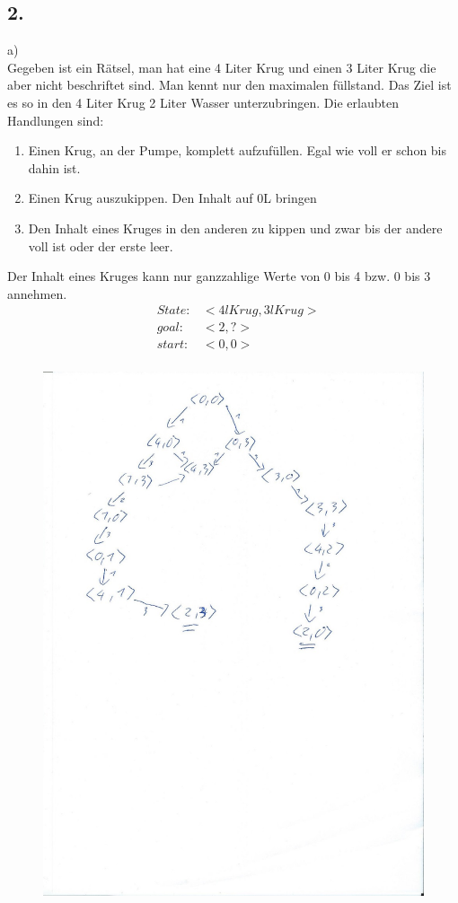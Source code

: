 \documentclass[12pt, paper=a4]{article}
\begin{document}
\subsection*{2.}
a)\\
Gegeben ist ein Rätsel, man hat eine 4 Liter Krug und einen 3 Liter Krug die aber nicht beschriftet sind. Man kennt nur den maximalen füllstand. Das Ziel ist es so in den 4 Liter Krug 2 Liter Wasser unterzubringen. Die erlaubten Handlungen sind:\\
\begin{enumerate}
\item Einen Krug, an der Pumpe, komplett aufzufüllen. Egal wie voll er schon bis dahin ist.
\item Einen Krug auszukippen. Den Inhalt auf 0L bringen
\item Den Inhalt eines Kruges in den anderen zu kippen und zwar bis der andere voll ist oder der erste leer.
\end{enumerate}
Der Inhalt eines Kruges kann nur ganzzahlige Werte von 0 bis 4 bzw. 0 bis 3 annehmen.\\

\begin{align*}
&State: &<4l Krug, 3l Krug>\\
&goal: &<2,?>\\
&start: &<0,0>\\
\end{align*}

\begin{figure}[h!]
\centering
\includegraphics[scale=0.7]{tree.jpg}
\end{figure}
\newpage
\end{document}
